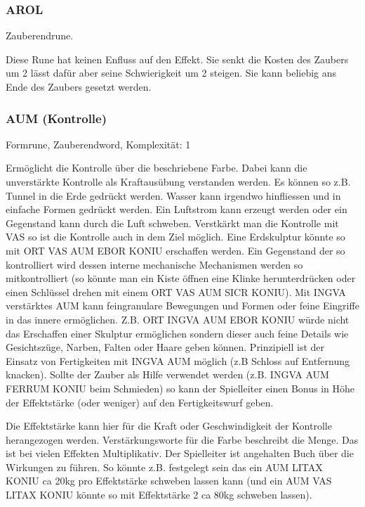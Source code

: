 \documentclass{article}
\begin{document}
\subsubsection{AROL}

Zauberendrune.

Diese Rune hat keinen Enfluss auf den Effekt. Sie senkt die Kosten des Zaubers um 2 lässt dafür aber seine
Schwierigkeit um 2 steigen. Sie kann beliebig ans Ende des Zaubers gesetzt werden.

\subsubsection{AUM (Kontrolle)}

Formrune, Zauberendword, Komplexität: 1

Ermöglicht die Kontrolle über die beschriebene Farbe. Dabei kann die unverstärkte Kontrolle als Kraftausübung
verstanden werden. Es können so z.B. Tunnel in die Erde gedrückt werden. Wasser kann irgendwo hinfliessen und in
einfache Formen gedrückt werden. Ein Luftstrom kann erzeugt werden oder ein Gegenstand kann durch die Luft schweben.
Verstkärkt man die Kontrolle mit VAS so ist die Kontrolle auch in dem Ziel möglich. Eine Erdskulptur könnte so mit
ORT VAS AUM EBOR KONIU erschaffen werden. Ein Gegenstand der so kontrolliert wird dessen interne mechanische Mechanismen
werden so mitkontrolliert (so könnte man ein Kiste öffnen eine Klinke herunterdrücken oder einen Schlüssel drehen mit
einem ORT VAS AUM SICR KONIU). Mit INGVA verstärktes AUM kann feingranulare Bewegungen und Formen oder feine Eingriffe
in das innere ermöglichen. Z.B. ORT INGVA AUM EBOR KONIU würde nicht das Erschaffen einer Skulptur ermöglichen sondern
dieser auch feine Details wie Gesichtszüge, Narben, Falten oder Haare geben können. Prinzipiell ist der Einsatz von
Fertigkeiten mit INGVA AUM möglich (z.B Schloss auf Entfernung knacken). Sollte der Zauber als Hilfe verwendet werden
(z.B. INGVA AUM FERRUM KONIU beim Schmieden) so kann der Spielleiter einen Bonus in Höhe der Effektstärke (oder weniger)
auf den Fertigkeitswurf geben.

Die Effektstärke kann hier für die Kraft oder Geschwindigkeit der Kontrolle herangezogen werden. Verstärkungsworte
für die Farbe beschreibt die Menge. Das ist bei vielen Effekten Multiplikativ. Der Spielleiter ist angehalten Buch
über die Wirkungen zu führen. So könnte z.B. festgelegt sein das ein AUM LITAX KONIU ca 20kg pro Effektstärke
schweben lassen kann (und ein AUM VAS LITAX KONIU könnte so mit Effektstärke 2 ca 80kg schweben lassen).
\end{document}

